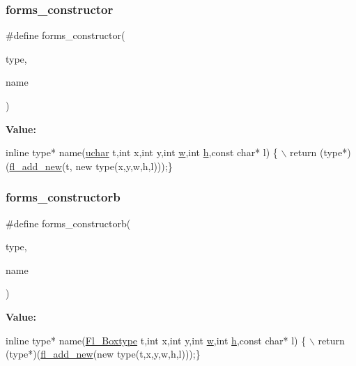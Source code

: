 \mbox{\label{forms_8_h_a58738698d8bea7773e34cc3ba7b79a8c}} 
\subsubsection{\texorpdfstring{forms\+\_\+constructor}{forms\_constructor}}
{\footnotesize\ttfamily \#define forms\+\_\+constructor(\begin{DoxyParamCaption}\item[{}]{type,  }\item[{}]{name }\end{DoxyParamCaption})}

{\bfseries Value\+:}
\begin{DoxyCode}
\textcolor{keyword}{inline} type* name(\hyperlink{fl__types_8h_a65f85814a8290f9797005d3b28e7e5fc}{uchar} t,\textcolor{keywordtype}{int} x,\textcolor{keywordtype}{int} y,\textcolor{keywordtype}{int} \hyperlink{forms_8_h_aac374e320caaadeca4874add33b62af2}{w},\textcolor{keywordtype}{int} \hyperlink{forms_8_h_a7e427ba5b307f9068129699250690066}{h},\textcolor{keyword}{const} \textcolor{keywordtype}{char}* l) \{ \(\backslash\)
 return (type*)(\hyperlink{forms_8_h_a28097874af477fb5cb118aa64fed865a}{fl\_add\_new}(t, \textcolor{keyword}{new} type(x,y,w,h,l)));\}
\end{DoxyCode}
\mbox{\label{forms_8_h_ab7691022c658c7efb7cd346d28ec2706}} 
\subsubsection{\texorpdfstring{forms\+\_\+constructorb}{forms\_constructorb}}
{\footnotesize\ttfamily \#define forms\+\_\+constructorb(\begin{DoxyParamCaption}\item[{}]{type,  }\item[{}]{name }\end{DoxyParamCaption})}

{\bfseries Value\+:}
\begin{DoxyCode}
\textcolor{keyword}{inline} type* name(\hyperlink{_enumerations_8_h_ae48bf9070f8541de17829f54ccacc6bc}{Fl\_Boxtype} t,\textcolor{keywordtype}{int} x,\textcolor{keywordtype}{int} y,\textcolor{keywordtype}{int} \hyperlink{forms_8_h_aac374e320caaadeca4874add33b62af2}{w},\textcolor{keywordtype}{int} \hyperlink{forms_8_h_a7e427ba5b307f9068129699250690066}{h},\textcolor{keyword}{const} \textcolor{keywordtype}{char}* l) \{ \(\backslash\)
 return (type*)(\hyperlink{forms_8_h_a28097874af477fb5cb118aa64fed865a}{fl\_add\_new}(\textcolor{keyword}{new} type(t,x,y,w,h,l)));\}
\end{DoxyCode}
\mbox{\label{forms_8_h_abbb416dff528f454755c205fcfa93916}} 

